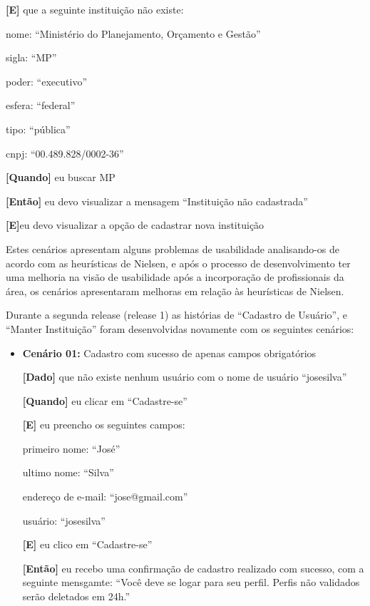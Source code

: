 \begin{itemize}
\textbf{[E]} que a seguinte instituição não existe:

 \subitem nome: ``Ministério do Planejamento, Orçamento e Gestão''

  \subitem sigla: ``MP''

  \subitem poder: ``executivo''

  \subitem esfera: ``federal''

  \subitem tipo: ``pública''
  
  \subitem cnpj: ``00.489.828/0002-36''

\textbf{[Quando]} eu buscar MP

\textbf{[Então]} eu devo visualizar a mensagem ``Instituição não cadastrada''

\textbf{[E]}eu devo visualizar a opção de cadastrar nova instituição
\end{itemize}

Estes cenários apresentam alguns problemas de usabilidade analisando-os de acordo com as heurísticas de Nielsen, e após o processo de desenvolvimento ter uma melhoria na visão de usabilidade após a incorporação de profissionais da área, os cenários apresentaram melhoras em relação às heurísticas de Nielsen. 

Durante a segunda release (release 1) as histórias de ``Cadastro de Usuário'', e ``Manter Instituição'' foram desenvolvidas novamente com os seguintes cenários:

\begin{itemize}
\item\textbf{Cenário 01:} Cadastro com sucesso de apenas campos obrigatórios

	\textbf{[Dado]} que não existe nenhum usuário com o nome de usuário ``josesilva''

	\textbf{[Quando]} eu clicar em ``Cadastre-se''

	\textbf{[E]} eu preencho os seguintes campos: 

  		\subitem primeiro nome: ``José''

  		\subitem ultimo nome: ``Silva''

  		\subitem endereço de e-mail: ``jose@gmail.com''

  		\subitem usuário: ``josesilva''
  		
	\textbf{[E]} eu clico em ``Cadastre-se''

	\textbf{[Então]} eu recebo uma confirmação de cadastro realizado com sucesso, com a seguinte mensgamte: 
	``Você deve se logar para seu perfil. Perfis não validados serão deletados em 24h.''
\end{itemize}

